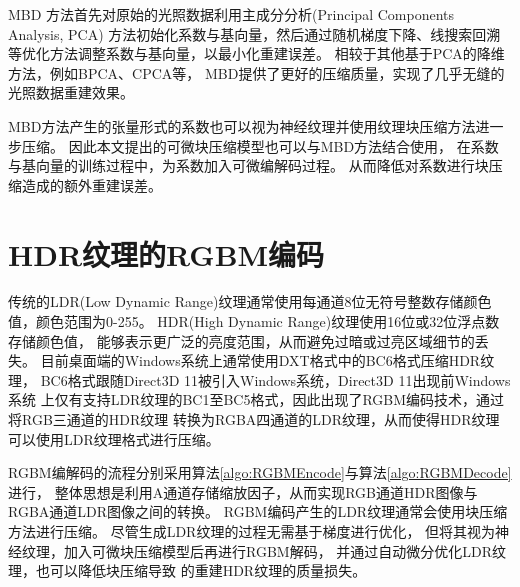 MBD\cite{silvennoinen2021moving} 方法首先对原始的光照数据利用主成分分析(Principal Components Analysis, PCA)
方法初始化系数与基向量，然后通过随机梯度下降、线搜索回溯等优化方法调整系数与基向量，以最小化重建误差。
相较于其他基于PCA的降维方法，例如BPCA\cite{nishino2005clustered}、CPCA\cite{sloan2003clustered}等，
MBD提供了更好的压缩质量，实现了几乎无缝的光照数据重建效果。

MBD方法产生的张量形式的系数也可以视为神经纹理并使用纹理块压缩方法进一步压缩。
因此本文提出的可微块压缩模型也可以与MBD方法结合使用，
在系数与基向量的训练过程中，为系数加入可微编解码过程。
从而降低对系数进行块压缩造成的额外重建误差。

\section{HDR纹理的RGBM编码}

传统的LDR(Low Dynamic Range)纹理通常使用每通道8位无符号整数存储颜色值，颜色范围为0-255。
HDR(High Dynamic Range)纹理使用16位或32位浮点数存储颜色值，
能够表示更广泛的亮度范围，从而避免过暗或过亮区域细节的丢失。
目前桌面端的Windows系统上通常使用DXT格式中的BC6格式压缩HDR纹理，
BC6格式跟随Direct3D 11被引入Windows系统，Direct3D 11出现前Windows系统
上仅有支持LDR纹理的BC1至BC5格式，因此出现了RGBM编码技术，通过将RGB三通道的HDR纹理
转换为RGBA四通道的LDR纹理，从而使得HDR纹理可以使用LDR纹理格式进行压缩。

RGBM编解码的流程分别采用算法\ref{algo:RGBMEncode}与算法\ref{algo:RGBMDecode}进行，
整体思想是利用A通道存储缩放因子，从而实现RGB通道HDR图像与RGBA通道LDR图像之间的转换。
RGBM编码产生的LDR纹理通常会使用块压缩方法进行压缩。
尽管生成LDR纹理的过程无需基于梯度进行优化，
但将其视为神经纹理，加入可微块压缩模型后再进行RGBM解码，
并通过自动微分优化LDR纹理，也可以降低块压缩导致
的重建HDR纹理的质量损失。


